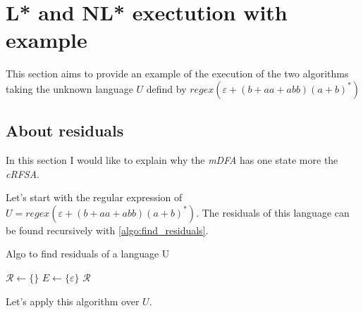 \section{L* and NL* exectution with example}

This section aims to provide an example of the execution of the two algorithms taking the unknown language $U$ defind by $regex(\varepsilon+(b+aa+abb)(a+b)^*)$ %



\subsection{About residuals}
In this section I would like to explain why the \textit{mDFA} has one state more the \textit{cRFSA}.



\begin{algorithm}[H]Let's start with the regular expression of $U = regex(\varepsilon+(b+aa+abb)(a+b)^*)$. The residuals of this language can be found recursively with \cref{algo:find_residuals}.
  \caption{Algo to find residuals of a language U}
  \label{algo:find_residuals}
  $\mathcal{R} \gets \{\}$ 
  $E \gets \{\varepsilon\}$
  \Return $\mathcal{R}$
\end{algorithm}

Let's apply this algorithm over $U$.



